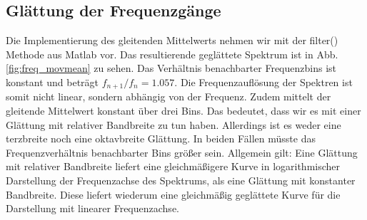 \subsection{Glättung der Frequenzgänge}
Die Implementierung des gleitenden Mittelwerts nehmen wir mit der filter() Methode aus Matlab vor.
Das resultierende geglättete Spektrum ist in Abb. \ref{fig:freq_movmean} zu sehen. Das Verhältnis benachbarter Frequenzbins ist konstant und beträgt $f_{n+1}/f_{n} = 1.057$.
Die Frequenzauflösung der Spektren ist somit nicht linear, sondern abhängig von der Frequenz.
Zudem mittelt der gleitende Mittelwert konstant über drei Bins.
Das bedeutet, dass wir es mit einer Glättung mit relativer Bandbreite zu tun haben.
Allerdings ist es weder eine terzbreite noch eine oktavbreite Glättung.
In beiden Fällen müsste das Frequenzverhältnis benachbarter Bins größer sein.
Allgemein gilt: Eine Glättung mit relativer Bandbreite liefert eine gleichmäßigere Kurve in logarithmischer Darstellung der Frequenzachse des Spektrums, als eine Glättung mit konstanter Bandbreite.
Diese liefert wiederum eine gleichmäßig geglättete Kurve für die Darstellung mit linearer Frequenzachse.

